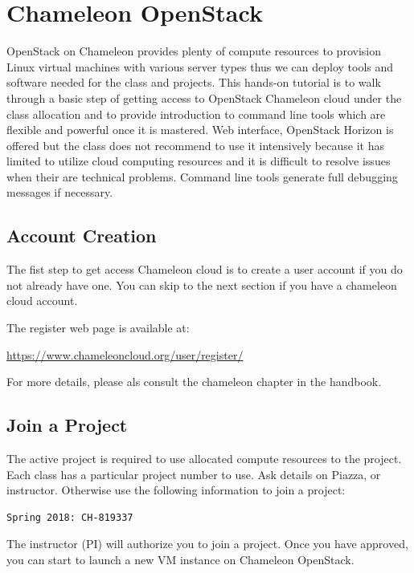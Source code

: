 \section{Chameleon OpenStack}
\label{chameleon-openstack}

OpenStack on Chameleon provides plenty of compute resources to
provision Linux virtual machines with various server types thus we can
deploy tools and software needed for the class and projects. This
hands-on tutorial is to walk through a basic step of getting access to
OpenStack Chameleon cloud under the class allocation and to provide
introduction to command line tools which are flexible and powerful
once it is mastered. Web interface, OpenStack Horizon is offered but
the class does not recommend to use it intensively because it has
limited to utilize cloud computing resources and it is difficult to
resolve issues when their are technical problems. Command line tools
generate full debugging messages if necessary.

\subsection{Account Creation}

The fist step to get access Chameleon cloud is to create a user
account if you do not already have one. You can skip to the next
section if you have a chameleon cloud account.

The register web page is available at:

\url{https://www.chameleoncloud.org/user/register/}

For more details, please als consult the chameleon chapter in the handbook.

\subsection{Join a Project}

The active project is required to use allocated compute resources to
the project.  Each class has a particular project number to use. Ask
details on Piazza, or instructor. Otherwise use the following
information to join a project:

\begin{lstlisting}
Spring 2018: CH-819337
\end{lstlisting}

The instructor (PI) will authorize you to join a project. Once you
have approved, you can start to launch a new VM instance on Chameleon
OpenStack.

